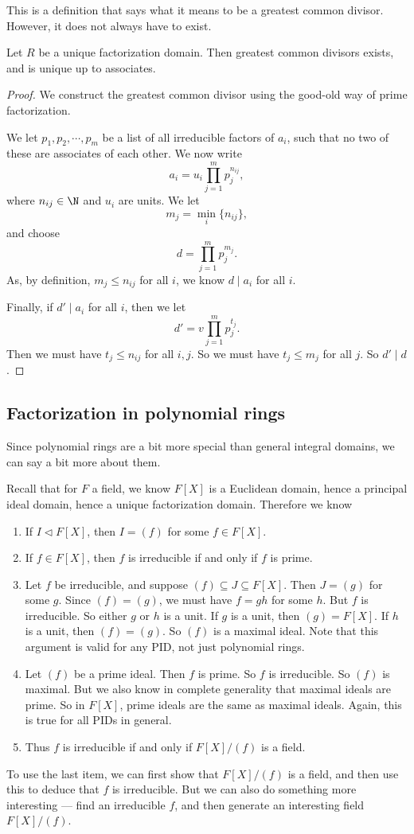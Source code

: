 \documentclass[a4paper]{article}
\begin{document}
This is a definition that says what it means to be a greatest common divisor. However, it does not always have to exist.
\begin{lemma}
  Let $R$ be a unique factorization domain. Then greatest common divisors exists, and is unique up to associates.
\end{lemma}

\begin{proof}
  We construct the greatest common divisor using the good-old way of prime factorization.

  We let $p_1, p_2, \cdots, p_m$ be a list of all irreducible factors of $a_i$, such that no two of these are associates of each other. We now write
  \[
    a_i = u_i\prod_{j = 1}^m p_j^{n_{ij}},
  \]
  where $n_{ij} \in \N$ and $u_i$ are units. We let
  \[
    m_j = \min_i \{n_{ij}\},
  \]
  and choose
  \[
    d = \prod_{j = 1}^m p_j^{m_j}.
  \]
  As, by definition, $m_j \leq n_{ij}$ for all $i$, we know $d \mid a_i$ for all $i$.

  Finally, if $d' \mid a_i$ for all $i$, then we let
  \[
    d' = v \prod_{j = 1}^m p_j^{t_j}.
  \]
  Then we must have $t_j \leq n_{ij}$ for all $i, j$. So we must have $t_j \leq m_j$ for all $j$. So $d' \mid d$.
\end{proof}

\subsection{Factorization in polynomial rings}
Since polynomial rings are a bit more special than general integral domains, we can say a bit more about them.

Recall that for $F$ a field, we know $F[X]$ is a Euclidean domain, hence a principal ideal domain, hence a unique factorization domain. Therefore we know
\begin{enumerate}
  \item If $I \lhd F[X]$, then $I = (f)$ for some $f \in F[X]$.
  \item If $f \in F[X]$, then $f$ is irreducible if and only if $f$ is prime.
  \item Let $f$ be irreducible, and suppose $(f) \subseteq J \subseteq F[X]$. Then $J = (g)$ for some $g$. Since $(f) = (g)$, we must have $f = gh$ for some $h$. But $f$ is irreducible. So either $g$ or $h$ is a unit. If $g$ is a unit, then $(g) = F[X]$. If $h$ is a unit, then $(f) = (g)$. So $(f)$ is a maximal ideal. Note that this argument is valid for any PID, not just polynomial rings.
  \item Let $(f)$ be a prime ideal. Then $f$ is prime. So $f$ is irreducible. So $(f)$ is maximal. But we also know in complete generality that maximal ideals are prime. So in $F[X]$, prime ideals are the same as maximal ideals. Again, this is true for all PIDs in general.
  \item Thus $f$ is irreducible if and only if $F[X]/(f)$ is a field.
\end{enumerate}
To use the last item, we can first show that $F[X]/(f)$ is a field, and then use this to deduce that $f$ is irreducible. But we can also do something more interesting --- find an irreducible $f$, and then generate an interesting field $F[X]/(f)$.
\end{document}
